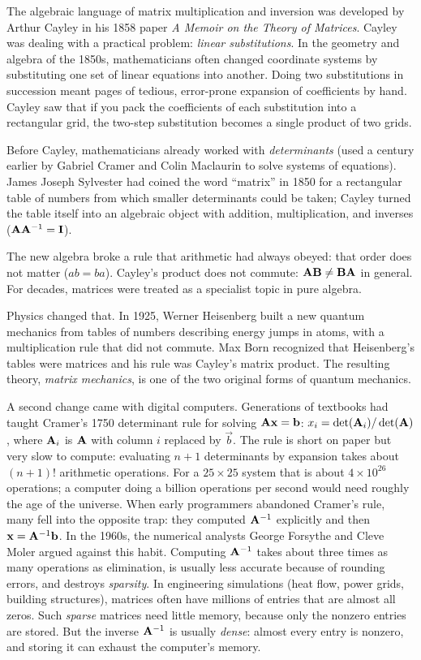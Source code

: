 \begin{historybox}
The algebraic language of matrix multiplication and inversion was developed by Arthur Cayley in his
1858 paper \emph{A Memoir on the Theory of Matrices}. Cayley was dealing with a practical problem:
\emph{linear substitutions}. In the geometry and algebra of the 1850s, mathematicians often changed
coordinate systems by substituting one set of linear equations into another. Doing two substitutions in succession
meant pages of tedious, error-prone expansion of coefficients by hand. Cayley saw that if you pack
the coefficients of each substitution into a rectangular grid, the two-step substitution becomes
a single product of two grids.

Before Cayley, mathematicians already worked with \emph{determinants} (used a century earlier by Gabriel
Cramer and Colin Maclaurin to solve systems of equations). James Joseph Sylvester had coined
the word ``matrix'' in 1850 for a rectangular table of numbers from which smaller determinants could be taken;
Cayley turned the table itself into an algebraic object with addition,
multiplication, and inverses ($\mathbf{A}\mathbf{A}^{-1} = \mathbf{I}$).

The new algebra broke a rule that arithmetic had always obeyed: that order does not matter ($ab = ba$).
Cayley's product does not commute: $\mathbf{A}\mathbf{B} \ne \mathbf{B}\mathbf{A}$ in general. For decades, matrices
were treated as a specialist topic in pure algebra.

Physics changed that. In 1925, Werner Heisenberg built a new quantum mechanics from tables of numbers
describing energy jumps in atoms, with a multiplication rule that did not commute. Max Born recognized
that Heisenberg's tables were matrices and his rule was Cayley's matrix product. The resulting theory,
\emph{matrix mechanics}, is one of the two original forms of quantum mechanics.

A second change came with digital computers. Generations of textbooks had taught
Cramer's 1750 determinant rule for solving $\mathbf{A}\mathbf{x} = \mathbf{b}$: $x_i = \det(\mathbf{A}_i) / \det(\mathbf{A})$,
where $\mathbf{A}_i$ is $\mathbf{A}$ with column $i$ replaced by $\vec{b}$.
The rule is short on paper but very slow to compute: evaluating $n+1$ determinants by expansion takes
about $(n+1)!$ arithmetic operations. For a $25\times 25$ system that is about $4\times 10^{26}$ operations;
a computer doing a billion operations per second would need roughly the age of the universe. When early
programmers abandoned Cramer's rule, many fell into the opposite trap: they computed $\mathbf{A}^{-1}$ explicitly and then
$\mathbf{x} = \mathbf{A}^{-1}\mathbf{b}$. In the 1960s, the numerical analysts George Forsythe and Cleve Moler argued against
this habit. Computing $\mathbf{A}^{-1}$ takes about three times as many operations as elimination, is usually less
accurate because of rounding errors, and destroys \emph{sparsity}. In engineering simulations (heat flow, power grids,
building structures), matrices often have millions of entries that are almost all zeros. Such \emph{sparse} matrices
need little memory, because only the nonzero entries are stored. But the inverse $\mathbf{A}^{-1}$ is usually
\emph{dense}: almost every entry is nonzero, and storing it can exhaust the computer's memory.


\end{historybox}
